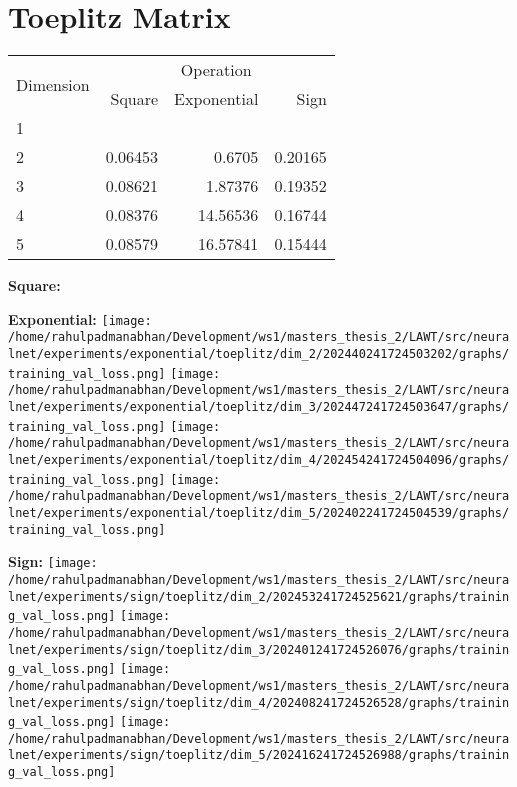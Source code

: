 \documentclass{article}
\begin{document}
\pagebreak
\section{Toeplitz Matrix}
\begin{tabular}{@{}lrrr@{}}
\toprule
\multirow{2}{*}{Dimension} & \multicolumn{3}{c}{Operation} \\
\cmidrule(l){2-4}
& Square & Exponential & Sign \\
\midrule
1 & & & \\
2 & 0.06453 & 0.6705 & 0.20165 \\
3 & 0.08621 & 1.87376 & 0.19352 \\
4 & 0.08376 & 14.56536 & 0.16744 \\
5 & 0.08579 & 16.57841 & 0.15444 \\
\bottomrule
\end{tabular}

\textbf{Square:}

\textbf{Exponential:}
\texttt{[image: /home/rahulpadmanabhan/Development/ws1/masters\_thesis\_2/LAWT/src/neuralnet/experiments/exponential/toeplitz/dim\_2/202440241724503202/graphs/training\_val\_loss.png]}
\texttt{[image: /home/rahulpadmanabhan/Development/ws1/masters\_thesis\_2/LAWT/src/neuralnet/experiments/exponential/toeplitz/dim\_3/202447241724503647/graphs/training\_val\_loss.png]}
\texttt{[image: /home/rahulpadmanabhan/Development/ws1/masters\_thesis\_2/LAWT/src/neuralnet/experiments/exponential/toeplitz/dim\_4/202454241724504096/graphs/training\_val\_loss.png]}
\texttt{[image: /home/rahulpadmanabhan/Development/ws1/masters\_thesis\_2/LAWT/src/neuralnet/experiments/exponential/toeplitz/dim\_5/202402241724504539/graphs/training\_val\_loss.png]}

\textbf{Sign:}
\texttt{[image: /home/rahulpadmanabhan/Development/ws1/masters\_thesis\_2/LAWT/src/neuralnet/experiments/sign/toeplitz/dim\_2/202453241724525621/graphs/training\_val\_loss.png]}
\texttt{[image: /home/rahulpadmanabhan/Development/ws1/masters\_thesis\_2/LAWT/src/neuralnet/experiments/sign/toeplitz/dim\_3/202401241724526076/graphs/training\_val\_loss.png]}
\texttt{[image: /home/rahulpadmanabhan/Development/ws1/masters\_thesis\_2/LAWT/src/neuralnet/experiments/sign/toeplitz/dim\_4/202408241724526528/graphs/training\_val\_loss.png]}
\texttt{[image: /home/rahulpadmanabhan/Development/ws1/masters\_thesis\_2/LAWT/src/neuralnet/experiments/sign/toeplitz/dim\_5/202416241724526988/graphs/training\_val\_loss.png]}
\end{document}
